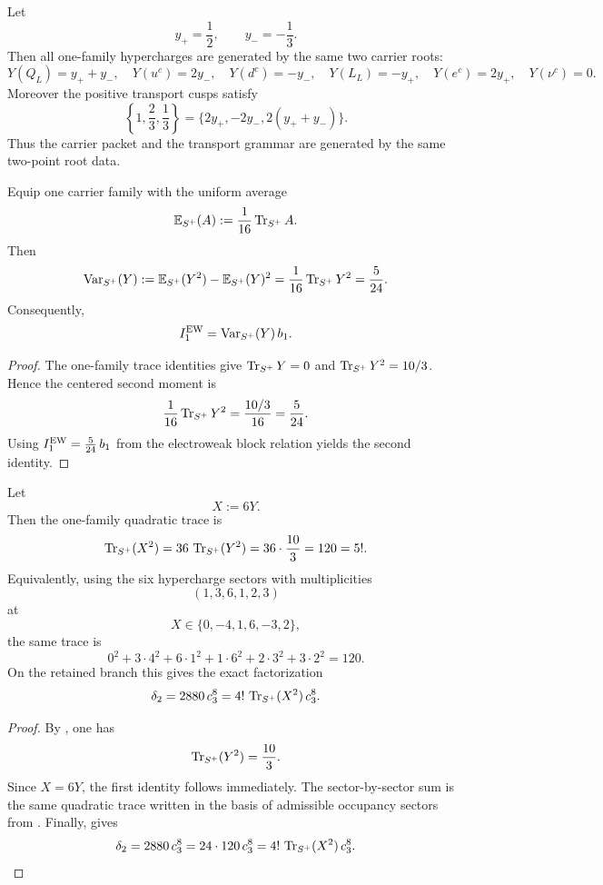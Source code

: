 \begin{remark}
Let
\[
y_+=\frac12,
\qquad
y_-=-\frac13.
\]
Then all one-family hypercharges are generated by the same two carrier roots:
\[
Y(Q_L)=y_++y_-,
\quad
Y(u^c)=2y_-,
\quad
Y(d^c)=-y_-,
\quad
Y(L_L)=-y_+,
\quad
Y(e^c)=2y_+,
\quad
Y(\nu^c)=0.
\]
Moreover the positive transport cusps satisfy
\[
\left\{1,\frac23,\frac13\right\}=\{2y_+,-2y_-,2(y_++y_-)\}.
\]
Thus the carrier packet and the transport grammar are generated by the same two-point root data.
\end{remark}

\begin{corollary}
Equip one carrier family with the uniform average
\[
\mathbb E_{S^+}(A):=\frac{1}{16}\operatorname{Tr}_{S^+}A.
\]
Then
\[
\operatorname{Var}_{S^+}(Y)
:=
\mathbb E_{S^+}(Y^2)-\mathbb E_{S^+}(Y)^2
=
\frac{1}{16}\operatorname{Tr}_{S^+}Y^2
=
\frac{5}{24}.
\]
Consequently,
\[
I_1^{\mathrm{EW}}=\operatorname{Var}_{S^+}(Y)\,b_1.
\]
\end{corollary}

\begin{proof}
The one-family trace identities give $\operatorname{Tr}_{S^+}Y=0$ and $\operatorname{Tr}_{S^+}Y^2=10/3$. Hence the centered second moment is
\[
\frac{1}{16}\operatorname{Tr}_{S^+}Y^2=\frac{10/3}{16}=\frac{5}{24}.
\]
Using $I_1^{\mathrm{EW}}=\frac{5}{24}\,b_1$ from the electroweak block relation yields the second identity.
\end{proof}

\begin{corollary}
\label{cor:factorial-trace-delta2}
Let
\[
X:=6Y.
\]
Then the one-family quadratic trace is
\[
\operatorname{Tr}_{S^+}(X^2)
=
36\,\operatorname{Tr}_{S^+}(Y^2)
=
36\cdot\frac{10}{3}
=
120
=
5!.
\]
Equivalently, using the six hypercharge sectors with multiplicities
\[
(1,3,6,1,2,3)
\]
at
\[
X\in\{0,-4,1,6,-3,2\},
\]
the same trace is
\[
0^2+3\cdot 4^2+6\cdot 1^2+1\cdot 6^2+2\cdot 3^2+3\cdot 2^2=120.
\]
On the retained branch this gives the exact factorization
\[
\delta_2
=
2880\,c_3^8
=
4!\,\operatorname{Tr}_{S^+}(X^2)\,c_3^8.
\]
\end{corollary}

\begin{proof}
By , one has
\[
\operatorname{Tr}_{S^+}(Y^2)=\frac{10}{3}.
\]
Since $X=6Y$, the first identity follows immediately. The sector-by-sector sum is the same quadratic trace written in the basis of admissible occupancy sectors from . Finally,  gives
\[
\delta_2=2880\,c_3^8=24\cdot 120\,c_3^8
=
4!\,\operatorname{Tr}_{S^+}(X^2)\,c_3^8.
\]
\end{proof}

